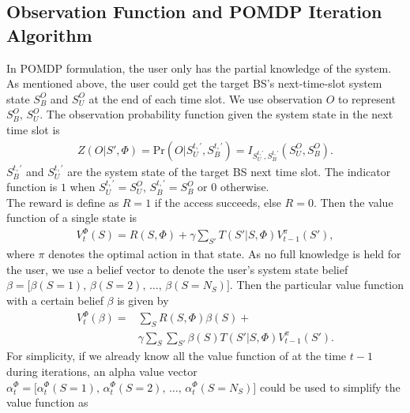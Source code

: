 \documentclass[journal,12pt,draftclsnofoot,onecolumn]{IEEEtran}
\begin{document}
\subsection{Observation Function and POMDP Iteration Algorithm}
In POMDP formulation, the user only has the partial knowledge of the system.
As mentioned above, the user could get the target BS's next-time-slot system state
\(S_B^O\) and \(S_U^O\) at the end of each time slot.
We use observation \(O\) to represent \(S_B^O,\,S_U^O\).
The observation probability function given the system state in the next time slot is
\begin{align}
	Z\left(O|S',\Phi\right) = \mbox{Pr}\left(O\Big|S_U^{t,'}, S_B^{t,'}\right) =
	I_{S_U^{t,'},S_B^{t,'}}\left(S_U^O, S_B^O\right).
\end{align}
\(S_B^{t,'}\) and \(S_U^{t,'}\) are the system state of the target BS next time slot.
The indicator function is \(1\) when \(S_U^{t,'} = S_U^O,\,S_B^{t,'}=S_B^O\) or \(0\) otherwise.\\\indent
The reward is define as \(R = 1\) if the access succeeds, else \(R= 0\).
Then the value function of a single state is
\begin{equation}
\begin{aligned}
	V_t^\Phi\left(S\right) = R\left(S,\Phi\right) +\gamma\sum\limits_{S'}T\left(S'|S,\Phi\right)V_{t-1}^\pi\left(S'\right),
\end{aligned}
\end{equation}
where \(\pi\) denotes the optimal action in that state.
As no full knowledge is held for the user, we use a belief vector to denote the user's system state belief
\(\beta = \lbrack \beta\left(S = 1\right),\,\beta\left(S = 2\right),\,\ldots,\,\beta\left(S = N_S\right)\rbrack\).	
Then the particular value function with a certain belief \(\beta\) is given by
\begin{equation}
\begin{aligned}
	V_t^\Phi\left(\beta\right) = & \sum\limits_{S}R\left(S,\Phi\right)\beta\left(S\right) +\\
	&	\gamma\sum\limits_{S}\sum\limits_{S'}\beta\left(S\right)T\left(S'|S,\Phi\right)V_{t-1}^\pi\left(S'\right).
\end{aligned}
\end{equation}
For simplicity, if we already know all the value function of at the time \(t-1\) during iterations,
an alpha value vector \(\alpha_t^\Phi = \lbrack \alpha_t^\Phi\left(S = 1\right),\,
\alpha_t^\Phi\left(S = 2\right),\,\ldots,\,\alpha_t^\Phi\left(S = N_S\right)\rbrack\)
could be used to simplify the value function as
\end{document}
